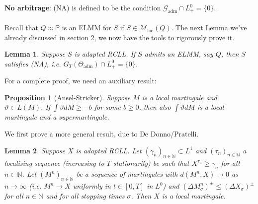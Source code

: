 \documentclass[12pt,a4paper, twoside]{article}
\newtheorem{lem}{Lemma}[section]
\newtheorem{prop}{Proposition}[section]
\theoremstyle{definition}
\newcommand{\PP}{\mathbb{P}} %
\begin{document}
\textbf{No arbitrage}: (NA) is defined to be the condition $\mathcal{G}_\text{adm} \cap L_+^0 = \{0 \}$.
\\\\
Recall that $Q \approx \PP$ is an ELMM for $S$ if $S \in \mathcal{M}_\text{loc}(Q)$. The next Lemma we've already discussed in section 2, we now have the tools to rigorously prove it. 
\begin{lem}\label{L41} Suppose $S$ is adapted RCLL. If $S$ admits an ELMM, say $Q$, then $S$ satisfies (NA), i.e. $G_T( \Theta_\text{adm}) \cap L_+^0 = \{0 \}$. 
\end{lem}
For a complete proof, we need an auxiliary result: 
\begin{prop}[Ansel-Stricker] \label{P41} Suppose $M$ is a local martingale and $\vartheta \in L(M)$. If $\int \vartheta dM \geq -b$ for some $b \geq 0$, then also $\int \vartheta dM$ is a local martingale and a supermartingale. 
\end{prop}
We first prove a more general result, due to De Donno/Pratelli.
\begin{lem} \label{L42} Suppose $X$ is adapted RCLL. Let $( \gamma_n)_{n \in \mathbb{N}} \subset L^1$ and $( \tau_n)_{n \in \mathbb{N}}$ a localising sequence (increasing to $T$ stationarily) be such that $X^{\tau_n} \geq \gamma_n$ for all $n \in \mathbb{N}$. Let $(M^n)_{n \in \mathbb{N}}$ be a sequence of martingales with $d(M^n,X) \to 0$ as $n \to \infty$ (i.e. $M^n \to X$ uniformly in $t \in [0,T]$ in $L^0$) and $( \Delta M_\sigma^n)^\pm \leq ( \Delta X_\sigma)^\pm$ for all $n \in \mathbb{N}$ and for all stopping times $\sigma$. Then $X$ is a local martingale. 
\end{lem}
\newpage
\end{document}
